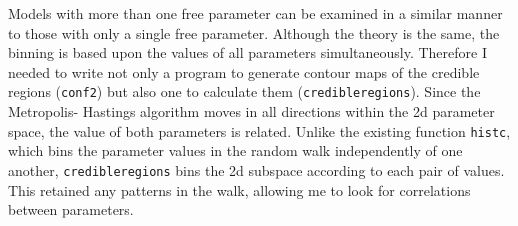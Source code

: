 Models with more than one free parameter can be examined in a similar manner to those with only a single free parameter. Although the theory is the same, the binning is based upon the values of all parameters simultaneously. Therefore I needed to write not only a program to generate contour maps of the credible regions (\texttt{conf2}) but also one to calculate them (\texttt{credibleregions}). Since the Metropolis- Hastings algorithm moves in all directions within the 2d parameter space, the value of both parameters is related. Unlike the existing \matlab{} function \texttt{histc}, which bins the parameter values in the random walk independently of one another, \texttt{credibleregions} bins the 2d subspace according to each pair of values. This retained any patterns in the walk, allowing me to look for correlations between parameters.
